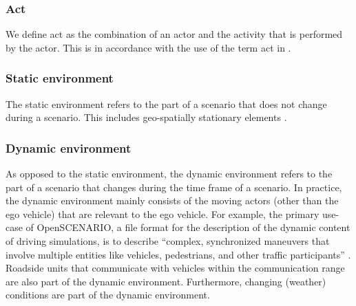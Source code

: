 
\cbstartc
\subsubsection{Act}
\label{sec:act}

We define act as the combination of an actor and the activity that is performed by the actor. %
This is in accordance with the use of the term act in \cite{openscenario}. 
\cbend

\subsubsection{Static environment}
\label{sec:static environment}
The static environment refers to the part of a scenario that does not change during a scenario. This includes geo-spatially stationary elements \cite{ulbrich2015}. 

\subsubsection{Dynamic environment}
\label{sec:dynamic environment}
As opposed to the static environment, the dynamic environment refers to the part of a scenario that changes during the time frame of a scenario. 
In practice, the dynamic environment mainly consists of the moving actors (other than the ego vehicle) that are relevant to the ego vehicle.
\cbstartb
For example, the primary use-case of OpenSCENARIO, a file format for the description of the dynamic content of driving simulations, is to describe ``complex, synchronized maneuvers that involve multiple entities like vehicles, pedestrians, and other traffic participants'' \cite{openscenario}.
\cbend
Roadside units that communicate with vehicles within the communication range \cite{alsultan2014comprehensive} are also part of the dynamic environment. Furthermore, changing (weather) conditions are part of the dynamic environment.

